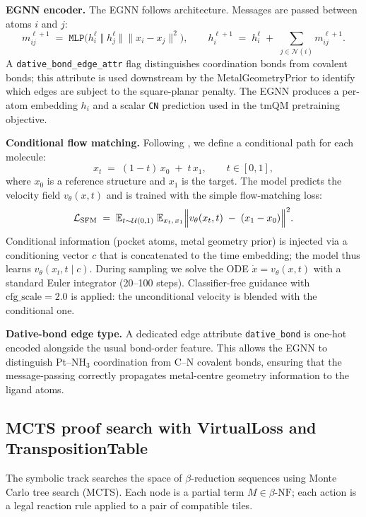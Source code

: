 \documentclass[10pt]{article}
\begin{document}
\medskip\noindent\textbf{EGNN encoder.}
The EGNN follows \cite{peng2022equibind} architecture.  Messages are passed
between atoms $i$ and $j$:
\[
  m_{ij}^{\ell+1}
  \;=\;
  \texttt{MLP}\bigl(h_i^\ell \;\Vert\; h_j^\ell \;\Vert\;
                 \|x_i - x_j\|^2 \bigr),
  \qquad
  h_i^{\ell+1}
  \;=\;
  h_i^\ell \;+\; \sum_{j\in\mathcal{N}(i)} m_{ij}^{\ell+1} .
\]
A \texttt{dative\_bond\_edge\_attr} flag distinguishes coordination bonds from
covalent bonds; this attribute is used downstream by the MetalGeometryPrior to
identify which edges are subject to the square-planar penalty.  The EGNN
produces a per-atom embedding $h_i$ and a scalar \texttt{CN} prediction used
in the tmQM pretraining objective.

\medskip\noindent\textbf{Conditional flow matching.}
Following \cite{lipman2023flow}, we define a conditional path for each
molecule:
\[
  x_t \;=\; (1-t)\,x_0 \;+\; t\,x_1 ,
  \qquad t\in[0,1] ,
\]
where $x_0$ is a reference structure and $x_1$ is the target.
The model predicts the velocity field $v_\theta(x,t)$ and is trained with the
simple flow-matching loss:
\[
  \mathcal{L}_{\text{SFM}}
  \;=\;
  \mathbb{E}_{t\sim\mathcal{U}(0,1)}\;
  \mathbb{E}_{x_t,\,x_1}
  \Bigl\|
    v_\theta(x_t,t) \;-\; (x_1 - x_0)
  \Bigr\|^2 .
\]
Conditional information (pocket atoms, metal geometry prior) is injected via a
conditioning vector $c$ that is concatenated to the time embedding; the model
thus learns $v_\theta(x_t,t\mid c)$.  During sampling we solve the ODE
$\dot{x}=v_\theta(x,t)$ with a standard Euler integrator (20--100 steps).
Classifier-free guidance \cite{ho2022classifier} with $\text{cfg\_scale}=2.0$
is applied: the unconditional velocity is blended with the conditional one.

\medskip\noindent\textbf{Dative-bond edge type.}
A dedicated edge attribute \texttt{dative\_bond} is one-hot encoded alongside
the usual bond-order feature.  This allows the EGNN to distinguish Pt--NH$_3$
coordination from C--N covalent bonds, ensuring that the message-passing
correctly propagates metal-centre geometry information to the ligand atoms.

\subsection{MCTS proof search with VirtualLoss and TranspositionTable}

The symbolic track searches the space of $\beta$-reduction sequences using
Monte Carlo tree search (MCTS).  Each node is a partial term
$M\in\beta\text{-NF}$; each action is a legal reaction rule applied to a pair
of compatible tiles.
\end{document}
